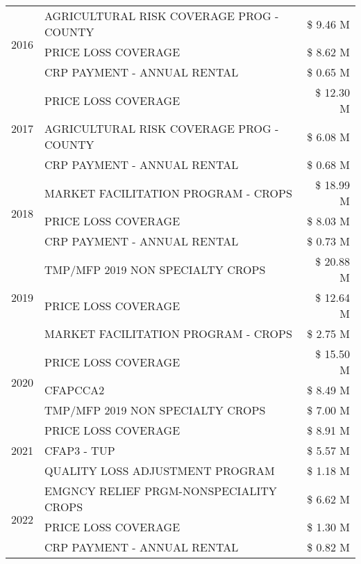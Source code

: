 \begin{tabular}{llr}
\cline{1-3}
\multirow[t]{3}{*}{2016} & AGRICULTURAL RISK COVERAGE PROG - COUNTY & \$ 9.46 M \\
 & PRICE LOSS COVERAGE & \$ 8.62 M \\
 & CRP PAYMENT - ANNUAL RENTAL & \$ 0.65 M \\
\cline{1-3}
\multirow[t]{3}{*}{2017} & PRICE LOSS COVERAGE & \$ 12.30 M \\
 & AGRICULTURAL RISK COVERAGE PROG - COUNTY & \$ 6.08 M \\
 & CRP PAYMENT - ANNUAL RENTAL & \$ 0.68 M \\
\cline{1-3}
\multirow[t]{3}{*}{2018} & MARKET FACILITATION PROGRAM - CROPS & \$ 18.99 M \\
 & PRICE LOSS COVERAGE & \$ 8.03 M \\
 & CRP PAYMENT - ANNUAL RENTAL & \$ 0.73 M \\
\cline{1-3}
\multirow[t]{3}{*}{2019} & TMP/MFP 2019 NON SPECIALTY CROPS & \$ 20.88 M \\
 & PRICE LOSS COVERAGE & \$ 12.64 M \\
 & MARKET FACILITATION PROGRAM - CROPS & \$ 2.75 M \\
\cline{1-3}
\multirow[t]{3}{*}{2020} & PRICE LOSS COVERAGE & \$ 15.50 M \\
 & CFAPCCA2 & \$ 8.49 M \\
 & TMP/MFP 2019 NON SPECIALTY CROPS & \$ 7.00 M \\
\cline{1-3}
\multirow[t]{3}{*}{2021} & PRICE LOSS COVERAGE & \$ 8.91 M \\
 & CFAP3 - TUP & \$ 5.57 M \\
 & QUALITY LOSS ADJUSTMENT PROGRAM & \$ 1.18 M \\
\cline{1-3}
\multirow[t]{3}{*}{2022} & EMGNCY RELIEF PRGM-NONSPECIALITY CROPS & \$ 6.62 M \\
 & PRICE LOSS COVERAGE & \$ 1.30 M \\
 & CRP PAYMENT - ANNUAL RENTAL & \$ 0.82 M \\
\cline{1-3}
\bottomrule
\end{tabular}
